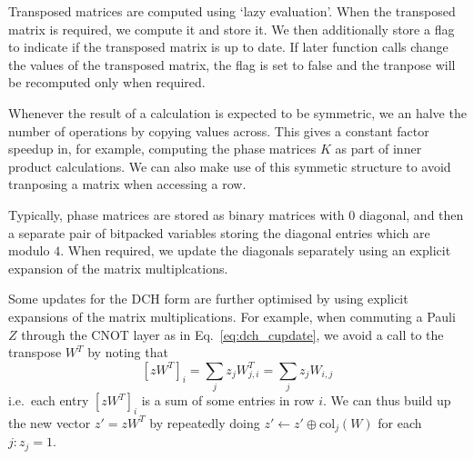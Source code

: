 Transposed matrices are computed using `lazy evaluation'. When the transposed matrix is required, we compute it and store it. We then additionally store a flag to indicate if the transposed matrix is up to date. If later function calls change the values of the transposed matrix, the flag is set to false and the tranpose will be recomputed only when required.\par
Whenever the result of a calculation is expected to be symmetric, we an halve the number of operations by copying values across. This gives a constant factor speedup in, for example, computing the phase matrices $K$ as part of inner product calculations. We can also make use of this symmetic structure to avoid tranposing a matrix when accessing a row.\par
Typically, phase matrices are stored as binary matrices with $0$ diagonal, and then a separate pair of bitpacked variables storing the diagonal entries which are modulo $4$. When required, we update the diagonals separately using an explicit expansion of the matrix multiplcations.\par
Some updates for the DCH form are further optimised by using explicit expansions of the matrix multiplications. For example, when commuting a Pauli $Z$ through the CNOT layer as in Eq.~\ref{eq:dch_cupdate}, we avoid a call to the transpose $W^{T}$ by noting that
\[[zW^{T}]_{i} = \sum_{j}z_{j}W^{T}_{j,i}=\sum_{j}z_{j}W_{i,j} \]
i.e.\ each entry $[zW^{T}]_{i}$ is a sum of some entries in row $i$. We can thus build up the new vector $z'=zW^{T}$ by repeatedly doing $z'\gets z' \oplus \text{col}_{j}(W)$ for each $j:z_{j}=1$.
